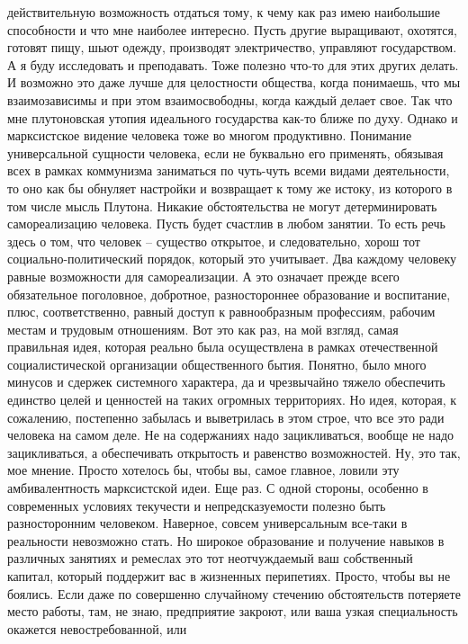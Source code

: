 действительную возможность отдаться тому, к чему как раз имею наибольшие
способности и что мне наиболее интересно. Пусть другие выращивают, охотятся,
готовят пищу, шьют одежду, производят электричество, управляют государством. А я
буду исследовать и преподавать. Тоже полезно что-то для этих других делать. И
возможно это даже лучше для целостности общества, когда понимаешь, что мы
взаимозависимы и при этом взаимосвободны, когда каждый делает свое. Так что мне
плутоновская утопия идеального государства как-то ближе по духу. Однако и
марксистское видение человека тоже во многом продуктивно. Понимание
универсальной сущности человека, если не буквально его применять, обязывая всех
в рамках коммунизма заниматься по чуть-чуть всеми видами деятельности, то оно
как бы обнуляет настройки и возвращает к тому же истоку, из которого в том числе
мысль Плутона. Никакие обстоятельства не могут детерминировать самореализацию
человека. Пусть будет счастлив в любом занятии. То есть речь здесь о том, что
человек – существо открытое, и следовательно, хорош тот социально-политический
порядок, который это учитывает. Два каждому человеку равные возможности для
самореализации. А это означает прежде всего обязательное поголовное, добротное,
разностороннее образование и воспитание, плюс, соответственно, равный доступ к
равнообразным профессиям, рабочим местам и трудовым отношениям. Вот это как раз,
на мой взгляд, самая правильная идея, которая реально была осуществлена в рамках
отечественной социалистической организации общественного бытия. Понятно, было
много минусов и сдержек системного характера, да и чрезвычайно тяжело обеспечить
единство целей и ценностей на таких огромных территориях. Но идея, которая, к
сожалению, постепенно забылась и выветрилась в этом строе, что все это ради
человека на самом деле. Не на содержаниях надо зацикливаться, вообще не надо
зацикливаться, а обеспечивать открытость и равенство возможностей. Ну, это так,
мое мнение. Просто хотелось бы, чтобы вы, самое главное, ловили эту
амбивалентность марксистской идеи. Еще раз. С одной стороны, особенно в
современных условиях текучести и непредсказуемости полезно быть разносторонним
человеком. Наверное, совсем универсальным все-таки в реальности невозможно
стать. Но широкое образование и получение навыков в различных занятиях и
ремеслах это тот неотчуждаемый ваш собственный капитал, который поддержит вас в
жизненных перипетиях. Просто, чтобы вы не боялись. Если даже по совершенно
случайному стечению обстоятельств потеряете место работы, там, не знаю,
предприятие закроют, или ваша узкая специальность окажется невостребованной, или
